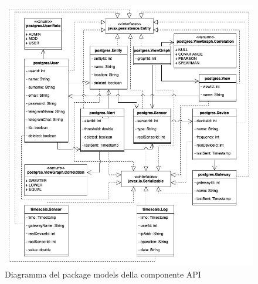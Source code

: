 		\begin{figure}[H]
			\centering
			\includegraphics[scale=0.550]{res/images/API/ModelsPackage.png}
			\caption{Diagramma del package models della componente API}
			\label{Diagramma 14}
		\end{figure}
